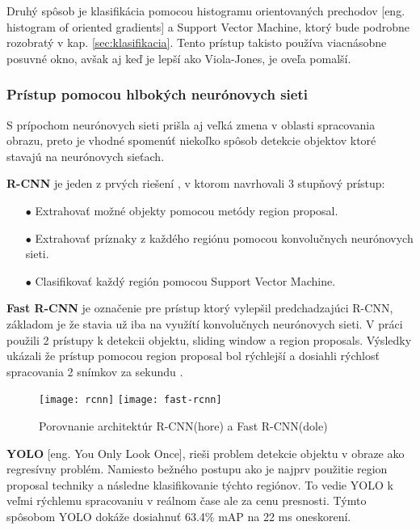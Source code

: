 Druhý spôsob je klasifikácia pomocou histogramu orientovaných prechodov [eng. histogram of oriented gradients] a Support Vector Machine, ktorý bude podrobne
    rozobratý v kap. \ref{sec:klasifikacia}. Tento prístup takisto používa viacnásobne posuvné okno, avšak aj keď je lepší ako Viola-Jones, je oveľa pomalší\cite{odkaz:ObjectDetectionOverview}.

\subsubsection{Prístup pomocou hlbokých neurónovych sieti}
S prípochom neurónovych sieti prišla aj veľká zmena v oblasti spracovania obrazu, preto je vhodné spomenúť niekoľko spôsob
    detekcie objektov ktoré stavajú na neurónovych sieťach.

\textbf{R-CNN} je jeden z prvých riešení \cite{prop:rcnn}, v ktorom navrhovali 3 stupňový prístup:
\begin{enumerate}
	\item[$\bullet$] Extrahovať možné objekty pomocou metódy region proposal.
    \item[$\bullet$] Extrahovať príznaky z každého regiónu pomocou konvolučnych neurónovych sieti.
    \item[$\bullet$] Clasifikovať každý región pomocou Support Vector Machine.
\end{enumerate}

\textbf{Fast R-CNN} je označenie pre prístup ktorý vylepšil predchadzajúci R-CNN, základom je že stavia už iba na využítí konvolučnych neurónovych sieti.
V práci použili 2 prístupy k detekcii objektu, sliding window a region proposals.
Výsledky ukázali že prístup pomocou region proposal bol rýchlejší a dosiahli rýchlosť spracovania 2 snímkov za sekundu \cite{prop:fast-rcnn}.
\begin{figure}[H]
    \centering
    \texttt{[image: rcnn]}
    \qquad
    \texttt{[image: fast-rcnn]}
    \caption{Porovnanie architektúr R-CNN(hore) a Fast R-CNN(dole)\cite{odkaz:ObjectDetectionOverview}}
    \label{pic:ActivationFunctions}
\end{figure}

\textbf{YOLO} [eng. You Only Look Once], rieši problem detekcie objektu v obraze ako regresívny problém.
Namiesto bežného postupu ako je najprv použitie region proposal techniky a následne klasifikovanie týchto regiónov.
To vedie YOLO k veľmi rýchlemu spracovaniu v reálnom čase ale za cenu presnosti.
Týmto spôsobom YOLO dokáže dosiahnuť 63.4\% mAP na 22 ms oneskorení\cite{prop:Redmon2016YouOL}.

